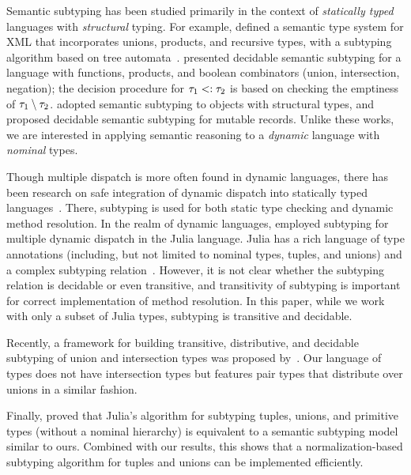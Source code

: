 Semantic subtyping has been studied primarily in the context of
\emph{statically typed} languages with \emph{structural} typing. 
For example, \citet{bib:Hosoya:2003:XDuce} defined 
a semantic type system for XML that incorporates unions, products,
and recursive types, with a subtyping algorithm based on tree 
automata~\cite{bib:Hosoya:2005:XML}.
\citet{bib:Frisch:2008:sem-sub} presented decidable semantic subtyping
for a language with functions, products, and boolean combinators 
(union, intersection, negation); the decision procedure 
for $\tau_1 <: \tau_2$ is based on checking
the emptiness of $\tau_1 \setminus \tau_2$. 
\citet{bib:Dardha:2013:semsub-oo} adopted semantic subtyping
to objects with structural types, and \citet{bib:Ancona:2016:sem-sub-oo} 
proposed decidable semantic subtyping for mutable records.
Unlike these works, we are interested in applying semantic reasoning
to a \emph{dynamic} language with \emph{nominal} types.

Though {multiple dispatch} is more often found in dynamic languages,
there has been research on safe integration of dynamic dispatch into
statically typed languages~\cite{bib:Chambers:1992:Cecil, 
Castagna:1992:COF:141471.141537, bib:Clifton:2000:MultiJava,
Allen:2011:TCM:2076021.2048140,Park:2019:PSM:3302515.3290324}. 
There, subtyping is used for both
static type checking and dynamic method resolution.
In the realm of dynamic languages, \citet{Bezanson2015AbstractionIT} 
employed subtyping for multiple dynamic dispatch in the Julia language.
Julia has a rich language of type annotations 
(including, but not limited to nominal types, tuples, and unions) 
and a complex subtyping relation~\cite{ZappaNardelli:2018:JSR:3288538.3276483}. 
However, it is not clear whether the subtyping relation is decidable 
or even transitive, and transitivity of subtyping is important
for correct implementation of method resolution.
In this paper, while we work with only a subset of Julia types, 
subtyping is transitive and decidable.

Recently, a framework for building transitive, distributive,
and decidable subtyping of union and intersection types was proposed 
by~\citet{Muehlboeck:2018:EUI:3288538.3276482}.
Our language of types does not have intersection types but features
pair types that distribute over unions in a similar fashion.

Finally, \citet{bib:Chung19} proved that Julia's algorithm for subtyping
tuples, unions, and primitive types (without a nominal hierarchy)
is equivalent to a semantic subtyping model similar to ours.
Combined with our results, this shows that a normalization-based
subtyping algorithm for tuples and unions can be implemented efficiently.
